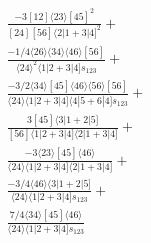 \documentclass[varwidth, border=5pt]{standalone}
\begin{document}
\begin{my}
$\begin{gathered}
\scriptscriptstyle\frac{-3[12]⟨23⟩[45]^2}{[24][56]⟨2|1+3|4]^2}+\\
\scriptscriptstyle\frac{-1/4⟨26⟩⟨34⟩⟨46⟩[56]}{⟨24⟩^2⟨1|2+3|4]s_{123}}+\\
\scriptscriptstyle\frac{-3/2⟨34⟩[45]⟨46⟩⟨56⟩[56]}{⟨24⟩⟨1|2+3|4]⟨4|5+6|4]s_{123}}+\\
\scriptscriptstyle\frac{3[45]⟨3|1+2|5]}{[56]⟨1|2+3|4]⟨2|1+3|4]}+\\
\scriptscriptstyle\frac{-3⟨23⟩[45]⟨46⟩}{⟨24⟩⟨1|2+3|4]⟨2|1+3|4]}+\\
\scriptscriptstyle\frac{-3/4⟨46⟩⟨3|1+2|5]}{⟨24⟩⟨1|2+3|4]s_{123}}+\\
\scriptscriptstyle\frac{7/4⟨34⟩[45]⟨46⟩}{⟨24⟩⟨1|2+3|4]s_{123}}\phantom{+}
\end{gathered}$
\end{my}
\end{document}
